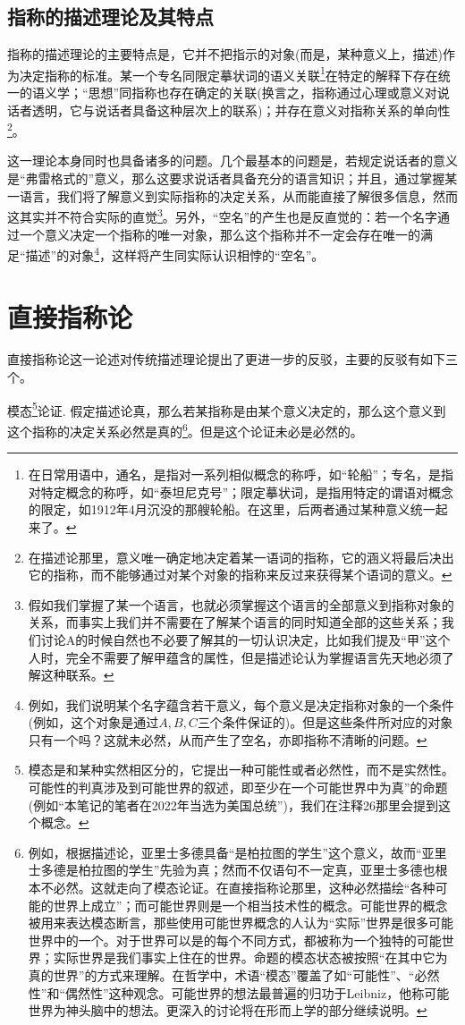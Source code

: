 \documentclass{article}
\begin{document}
\subsection{指称的描述理论及其特点}
指称的描述理论的主要特点是，它并不把指示的对象(而是，某种意义上，描述)作为决定指称的标准。某一个专名同限定摹状词的语义关联\footnote{在日常用语中，通名，是指对一系列相似概念的称呼，如“轮船”；专名，是指对特定概念的称呼，如“泰坦尼克号”；限定摹状词，是指用特定的谓语对概念的限定，如1912年4月沉没的那艘轮船。在这里，后两者通过某种意义统一起来了。}在特定的解释下存在统一的语义学；“思想”同指称也存在确定的关联(换言之，指称通过心理或意义对说话者透明，它与说话者具备这种层次上的联系)；并存在意义对指称关系的单向性\footnote{在描述论那里，意义唯一确定地决定着某一语词的指称，它的涵义将最后决出它的指称，而不能够通过对某个对象的指称来反过来获得某个语词的意义。}。

这一理论本身同时也具备诸多的问题。几个最基本的问题是，若规定说话者的意义是“弗雷格式的”意义，那么这要求说话者具备充分的语言知识；并且，通过掌握某一语言，我们将了解意义到实际指称的决定关系，从而能直接了解很多信息，然而这其实并不符合实际的直觉\footnote{假如我们掌握了某一个语言，也就必须掌握这个语言的全部意义到指称对象的关系，而事实上我们并不需要在了解某个语言的同时知道全部的这些关系；我们讨论A的时候自然也不必要了解其的一切认识决定，比如我们提及“甲”这个人时，完全不需要了解甲蕴含的属性，但是描述论认为掌握语言先天地必须了解这种联系。}。另外，“空名”的产生也是反直觉的：若一个名字通过一个意义决定一个指称的唯一对象，那么这个指称并不一定会存在唯一的满足“描述”的对象\footnote{例如，我们说明某个名字蕴含若干意义，每个意义是决定指称对象的一个条件(例如，这个对象是通过$A,B,C$三个条件保证的)。但是这些条件所对应的对象只有一个吗？这就未必然，从而产生了空名，亦即指称不清晰的问题。}，这样将产生同实际认识相悖的“空名”。

\section{直接指称论}
直接指称论这一论述对传统描述理论提出了更进一步的反驳，主要的反驳有如下三个。

{\kaishu 模态\footnote{模态是和某种实然相区分的，它提出一种可能性或者必然性，而不是实然性。可能性的判真涉及到可能世界的叙述，即至少在一个可能世界中为真”的命题(例如“本笔记的笔者在2022年当选为美国总统”)，我们在注释26那里会提到这个概念。}论证.}  假定描述论真，那么若某指称是由某个意义决定的，那么这个意义到这个指称的决定关系必然是真的\footnote{例如，根据描述论，亚里士多德具备“是柏拉图的学生”这个意义，故而“亚里士多德是柏拉图的学生”先验为真；然而不仅语句不一定真，亚里士多德也根本不必然。这就走向了模态论证。在直接指称论那里，这种必然描绘“各种可能的世界上成立”；而可能世界则是一个相当技术性的概念。可能世界的概念被用来表达模态断言，那些使用可能世界概念的人认为“实际”世界是很多可能世界中的一个。对于世界可以是的每个不同方式，都被称为一个独特的可能世界；实际世界是我们事实上住在的世界。命题的模态状态被按照“在其中它为真的世界”的方式来理解。在哲学中，术语“模态”覆盖了如“可能性”、“必然性”和“偶然性”这种观念。可能世界的想法最普遍的归功于Leibniz，他称可能世界为神头脑中的想法。更深入的讨论将在形而上学的部分继续说明。}。但是这个论证未必是必然的。
\end{document}
